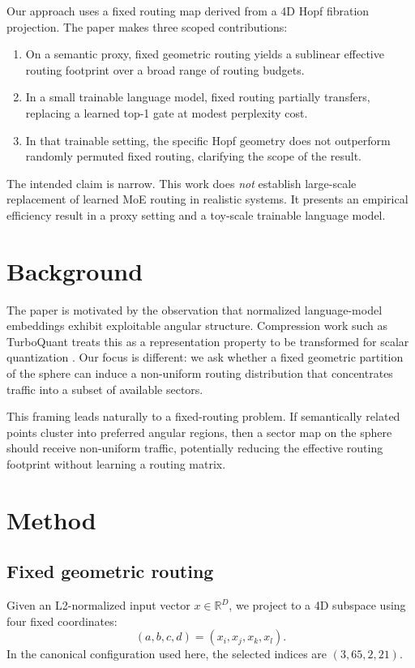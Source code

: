 \documentclass[10pt,twocolumn]{article}
\begin{document}
Our approach uses a fixed routing map derived from a 4D Hopf fibration projection. The paper makes three scoped contributions:
\begin{enumerate}
    \item On a semantic proxy, fixed geometric routing yields a sublinear effective routing footprint over a broad range of routing budgets.
    \item In a small trainable language model, fixed routing partially transfers, replacing a learned top-1 gate at modest perplexity cost.
    \item In that trainable setting, the specific Hopf geometry does not outperform randomly permuted fixed routing, clarifying the scope of the result.
\end{enumerate}

The intended claim is narrow. This work does \emph{not} establish large-scale replacement of learned MoE routing in realistic systems. It presents an empirical efficiency result in a proxy setting and a toy-scale trainable language model.

\section{Background}
The paper is motivated by the observation that normalized language-model embeddings exhibit exploitable angular structure. Compression work such as TurboQuant treats this as a representation property to be transformed for scalar quantization \citep{turboquant2026}. Our focus is different: we ask whether a fixed geometric partition of the sphere can induce a non-uniform routing distribution that concentrates traffic into a subset of available sectors.

This framing leads naturally to a fixed-routing problem. If semantically related points cluster into preferred angular regions, then a sector map on the sphere should receive non-uniform traffic, potentially reducing the effective routing footprint without learning a routing matrix.

\section{Method}
\subsection{Fixed geometric routing}
Given an L2-normalized input vector $x \in \mathbb{R}^D$, we project to a 4D subspace using four fixed coordinates:
\[
(a,b,c,d) = (x_i, x_j, x_k, x_l).
\]
In the canonical configuration used here, the selected indices are $(3,65,2,21)$.
\end{document}
